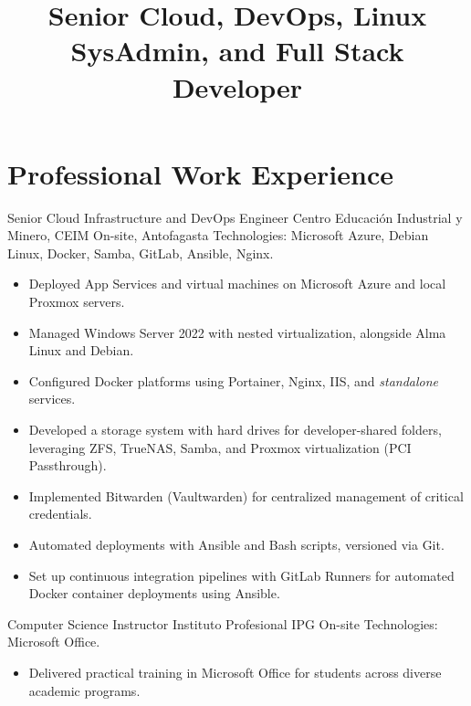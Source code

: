 \documentclass[12pt,letterpaper,sans]{moderncv}
\title {Senior Cloud, DevOps, Linux SysAdmin, and Full Stack Developer}
\begin{document}
\makecvtitle

\section{Professional Work Experience}

{Senior Cloud Infrastructure and DevOps Engineer}
{Centro Educación Industrial y Minero, CEIM}
{\newline On-site, Antofagasta}
{\newline Technologies: Microsoft Azure, Debian Linux, Docker, Samba, GitLab, Ansible, Nginx.}
{
  \begin{itemize}
    \item Deployed App Services and virtual machines on Microsoft Azure and local Proxmox servers.
    \item Managed Windows Server 2022 with nested virtualization, alongside Alma Linux and Debian.
    \item Configured Docker platforms using Portainer, Nginx, IIS, and \textit{standalone} services.
    \item Developed a storage system with hard drives for developer-shared folders, leveraging ZFS, TrueNAS, Samba, and Proxmox virtualization (PCI Passthrough).
    \item Implemented Bitwarden (Vaultwarden) for centralized management of critical credentials.
    \item Automated deployments with Ansible and Bash scripts, versioned via Git.
    \item Set up continuous integration pipelines with GitLab Runners for automated Docker container deployments using Ansible.
  \end{itemize}
}
\vspace{0.5em}

{Computer Science Instructor}
{Instituto Profesional IPG}
{\newline On-site}
{\newline Technologies: Microsoft Office.}
{
  \begin{itemize}
    \item Delivered practical training in Microsoft Office for students across diverse academic programs.
  \end{itemize}
}
\vspace{0.5em}
\end{document}
